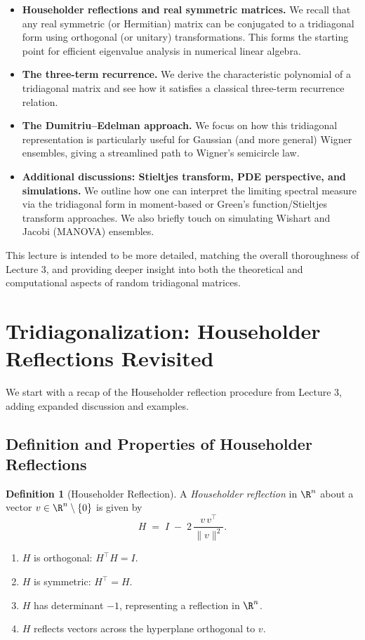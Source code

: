 \documentclass[letterpaper,11pt,oneside,reqno]{article}
\numberwithin{equation}{section}
\theoremstyle{definition}
\newtheorem{definition}[proposition]{Definition}
\begin{document}
\begin{itemize}
\item {\bf Householder reflections and real symmetric matrices.} We recall that any real symmetric (or Hermitian) matrix can be conjugated to a tridiagonal form using orthogonal (or unitary) transformations. This forms the starting point for efficient eigenvalue analysis in numerical linear algebra.
\item {\bf The three-term recurrence.} We derive the characteristic polynomial of a tridiagonal matrix and see how it satisfies a classical three-term recurrence relation.
\item {\bf The Dumitriu--Edelman approach.} We focus on how this tridiagonal representation is particularly useful for Gaussian (and more general) Wigner ensembles, giving a streamlined path to Wigner’s semicircle law.
\item {\bf Additional discussions: Stieltjes transform, PDE perspective, and simulations.} We outline how one can interpret the limiting spectral measure via the tridiagonal form in moment-based or Green’s function/Stieltjes transform approaches. We also briefly touch on simulating Wishart and Jacobi (MANOVA) ensembles.
\end{itemize}

This lecture is intended to be more detailed, matching the overall thoroughness of Lecture 3, and providing deeper insight into both the theoretical and computational aspects of random tridiagonal matrices.

\section{Tridiagonalization: Householder Reflections Revisited}
\label{sec:householder}

We start with a recap of the Householder reflection procedure from Lecture 3, adding expanded discussion and examples.

\subsection{Definition and Properties of Householder Reflections}

\begin{definition}[Householder Reflection]
A \emph{Householder reflection} in $\R^n$ about a vector $v \in \R^n \setminus\{0\}$ is given by
\[
  H \;=\;
  I \;-\; 2\,\frac{v\,v^\top}{\|v\|^2}.
\]
\begin{enumerate}[(1)]
\item $H$ is orthogonal: $H^\top H = I$.
\item $H$ is symmetric: $H^\top = H$.
\item $H$ has determinant $-1$, representing a reflection in $\R^n$.
\item $H$ reflects vectors across the hyperplane orthogonal to $v$.
\end{enumerate}
\end{definition}
\end{document}
